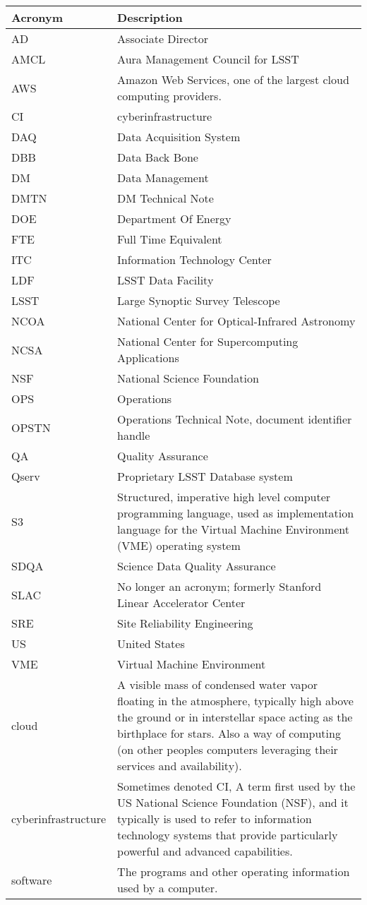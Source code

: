 \addtocounter{table}{-1}
\begin{longtable}{|l|p{}|}\hline
\textbf{Acronym} & \textbf{Description}  \\\hline

AD & Associate Director \\\hline
AMCL & Aura Management Council for LSST \\\hline
AWS & Amazon Web Services, one of the largest cloud computing providers. \\\hline
CI & \gls{cyberinfrastructure} \\\hline
DAQ & Data Acquisition System \\\hline
DBB & Data Back Bone \\\hline
DM & Data Management \\\hline
DMTN & DM Technical Note \\\hline
DOE & Department Of Energy \\\hline
FTE & Full Time Equivalent \\\hline
ITC & Information Technology Center \\\hline
LDF & LSST Data Facility \\\hline
LSST & Large Synoptic Survey Telescope \\\hline
NCOA & National Center for Optical-Infrared Astronomy \\\hline
NCSA & National Center for Supercomputing Applications \\\hline
NSF & National Science Foundation \\\hline
OPS & Operations \\\hline
OPSTN & Operations Technical Note, document identifier handle \\\hline
QA & Quality Assurance \\\hline
Qserv & Proprietary LSST Database system \\\hline
S3 & Structured, imperative high level computer programming language, used as implementation language for the Virtual Machine Environment (\gls{VME}) operating system \\\hline
SDQA & Science Data Quality Assurance \\\hline
SLAC & No longer an acronym; formerly Stanford Linear Accelerator Center \\\hline
SRE & Site Reliability Engineering \\\hline
US & United States \\\hline
VME & Virtual Machine Environment \\\hline
cloud & A visible mass of condensed water vapor floating in the atmosphere, typically high above the ground or in interstellar space acting as the birthplace for stars.  Also a way of computing (on other peoples computers leveraging their services and availability). \\\hline
cyberinfrastructure & Sometimes denoted CI, A term first used by the US National Science Foundation (\gls{NSF}), and it typically is used to refer to information technology systems that provide particularly powerful and advanced capabilities. \\\hline
software & The programs and other operating information used by a computer. \\\hline
\end{longtable}

